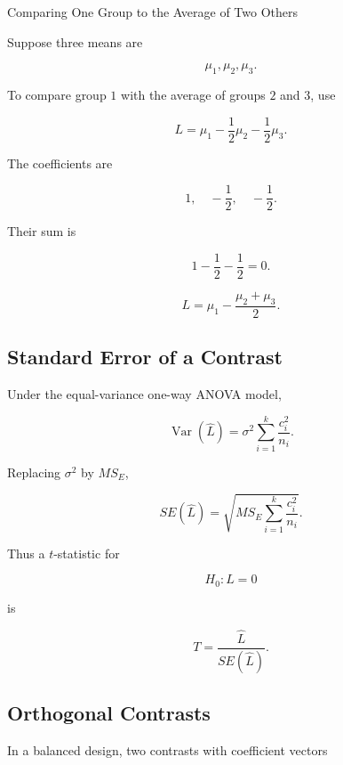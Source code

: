 \begin{workedexamplebox}{Comparing One Group to the Average of Two Others}

Suppose three means are

\[
\mu_1,
\mu_2,
\mu_3.
\]

To compare group \(1\) with the average of groups \(2\) and \(3\), use

\[
L
=
\mu_1
-
\frac12\mu_2
-
\frac12\mu_3.
\]

The coefficients are

\[
1,
\quad
-\frac12,
\quad
-\frac12.
\]

Their sum is

\[
1-\frac12-\frac12=0.
\]

\begin{answerbox}
\[
\boxed{
L
=
\mu_1
-
\frac{
\mu_2+\mu_3
}{2}.
}
\]
\end{answerbox}

\end{workedexamplebox}

\subsection{Standard Error of a Contrast}
\label{subsec:standard-error-contrast}

Under the equal-variance one-way ANOVA model,

\[
\boxed{
\operatorname{Var}(\widehat{L})
=
\sigma^2
\sum_{i=1}^{k}
\frac{
c_i^2
}{
n_i
}.
}
\]

Replacing \(\sigma^2\) by \(MS_E\),

\[
\boxed{
SE(\widehat{L})
=
\sqrt{
MS_E
\sum_{i=1}^{k}
\frac{
c_i^2
}{
n_i
}
}.
}
\]

Thus a \(t\)-statistic for

\[
H_0:L=0
\]

is

\[
\boxed{
T
=
\frac{
\widehat{L}
}{
SE(\widehat{L})
}.
}
\]

\subsection{Orthogonal Contrasts}
\label{subsec:orthogonal-contrasts}

In a balanced design, two contrasts with coefficient vectors

